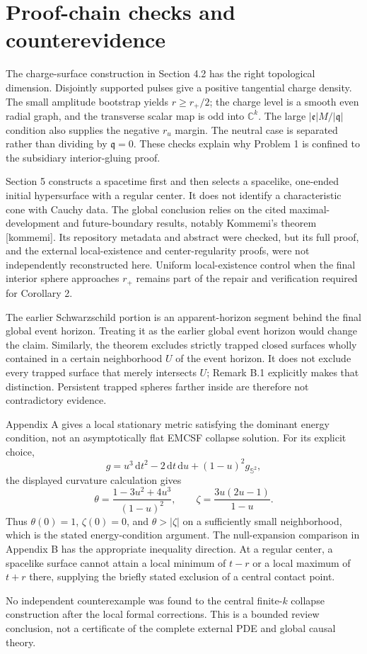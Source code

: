 \documentclass[10pt]{article}
\begin{document}
\section*{Proof-chain checks and counterevidence}
The charge-surface construction in Section 4.2 has the right topological dimension. Disjointly supported pulses give a positive tangential charge density. The small amplitude bootstrap yields \(r\geq r_+/2\); the charge level is a smooth even radial graph, and the transverse scalar map is odd into \(\mathbb C^k\). The large \(|\mathfrak e|M/|\mathfrak q|\) condition also supplies the negative \(r_u\) margin. The neutral case is separated rather than dividing by \(\mathfrak q=0\). These checks explain why Problem 1 is confined to the subsidiary interior-gluing proof.\par
Section 5 constructs a spacetime first and then selects a spacelike, one-ended initial hypersurface with a regular center. It does not identify a characteristic cone with Cauchy data. The global conclusion relies on the cited maximal-development and future-boundary results, notably Kommemi’s theorem [kommemi]. Its repository metadata and abstract were checked, but its full proof, and the external local-existence and center-regularity proofs, were not independently reconstructed here. Uniform local-existence control when the final interior sphere approaches \(r_+\) remains part of the repair and verification required for Corollary 2.\par
The earlier Schwarzschild portion is an apparent-horizon segment behind the final global event horizon. Treating it as the earlier global event horizon would change the claim. Similarly, the theorem excludes strictly trapped closed surfaces wholly contained in a certain neighborhood \(U\) of the event horizon. It does not exclude every trapped surface that merely intersects \(U\); Remark B.1 explicitly makes that distinction. Persistent trapped spheres farther inside are therefore not contradictory evidence.\par
Appendix A gives a local stationary metric satisfying the dominant energy condition, not an asymptotically flat EMCSF collapse solution. For its explicit choice, \[g=u^3\,\mathrm dt^2-2\,\mathrm dt\,\mathrm du+(1-u)^2g_{\mathbb S^2},\] the displayed curvature calculation gives \[\theta=\frac{1-3u^2+4u^3}{(1-u)^2},\qquad
 \zeta=\frac{3u(2u-1)}{1-u}.\] Thus \(\theta(0)=1\), \(\zeta(0)=0\), and \(\theta>|\zeta|\) on a sufficiently small neighborhood, which is the stated energy-condition argument. The null-expansion comparison in Appendix B has the appropriate inequality direction. At a regular center, a spacelike surface cannot attain a local minimum of \(t-r\) or a local maximum of \(t+r\) there, supplying the briefly stated exclusion of a central contact point.\par
No independent counterexample was found to the central finite-\(k\) collapse construction after the local formal corrections. This is a bounded review conclusion, not a certificate of the complete external PDE and global causal theory.\par
\end{document}
